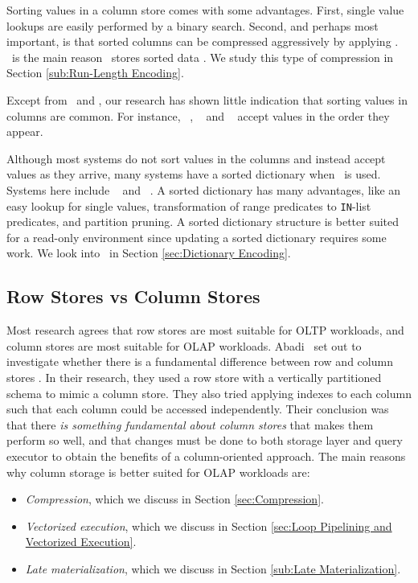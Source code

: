 Sorting values in a column store comes with some advantages. First, single value lookups are easily performed by a binary search. Second, and perhaps most important, is that sorted columns can be compressed aggressively by applying \rle. \rle~is the main reason \cstore~stores sorted data \cite{Stonebraker2005-qz}. We study this type of compression in Section \ref{sub:Run-Length Encoding}.

Except from \cstore~and \vertica, our research has shown little indication that sorting values in columns are common. For instance, \mssql~\cite{Larson2013-mc}, \blink~\cite{Raman2013-em} and \oracle~\cite{Lahiri2015-mz} accept values in the order they appear.

Although most systems do not sort values in the columns and instead accept values as they arrive, many systems have a sorted dictionary when \de~is used. Systems here include \blink~\cite{Johnson2008-cp} and \saph~\cite{Farber2012-vh}. A sorted dictionary has many advantages, like an easy lookup for single values, transformation of range predicates to \texttt{IN}-list predicates, and partition pruning. A sorted dictionary structure is better suited for a read-only environment since updating a sorted dictionary requires some work. We look into \de~in Section \ref{sec:Dictionary Encoding}. 

\subsection{Row Stores vs Column Stores}
\label{sub:Row Stores vs Column Stores}
Most research agrees that row stores are most suitable for OLTP workloads, and column stores are most suitable for OLAP workloads. Abadi \ea~set out to investigate whether there is a fundamental difference between row and column stores \cite{Abadi2008-dd}. In their research, they used a row store with a vertically partitioned schema to mimic a column store. They also tried applying indexes to each column such that each column could be accessed independently. Their conclusion was that there \textit{is something fundamental about column stores} that makes them perform so well, and that changes must be done to both storage layer and query executor to obtain the benefits of a column-oriented approach. The main reasons why column storage is better suited for OLAP workloads are:
\begin{itemize}
  \item \textit{Compression}, which we discuss in Section \ref{sec:Compression}.
  \item \textit{Vectorized execution}, which we discuss in Section \ref{sec:Loop Pipelining and Vectorized Execution}. 
  \item \textit{Late materialization}, which we discuss in Section \ref{sub:Late Materialization}. 
\end{itemize}

